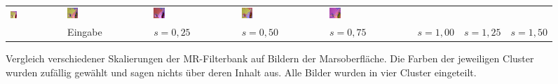 \begin{figure}[h!]
\begin{tabular}{m{15pt}m{}m{}m{}m{}m{}m{}m{}}
		\includegraphics[width=0.14\textwidth]{images/gen/filter_size/p03_04.png_0.50.png} &
		\includegraphics[width=0.14\textwidth]{images/gen/filter_size/p03_04.png_0.75.png} &
		\includegraphics[width=0.14\textwidth]{images/gen/filter_size/p03_04.png_1.00.png} &
		\includegraphics[width=0.14\textwidth]{images/gen/filter_size/p03_04.png_1.25.png} &
		\includegraphics[width=0.14\textwidth]{images/gen/filter_size/p03_04.png_1.50.png} \\
		
		&
		\vspace*{2pt}\centering Eingabe & 
		\vspace*{2pt}\centering $s=0,25$ &
		\vspace*{2pt}\centering $s=0,50$ &
		\vspace*{2pt}\centering $s=0,75$ &
		\vspace*{2pt}\centering $s=1,00$ &
		\vspace*{2pt}\centering $s=1,25$ &
		\vspace*{2pt}\centering $s=1,50$
	\end{tabular}
	\caption{Vergleich verschiedener Skalierungen der MR-Filterbank auf Bildern der Marsoberfläche. Die Farben der jeweiligen Cluster wurden zufällig gewählt und sagen nichts über deren Inhalt aus. Alle Bilder wurden in vier Cluster eingeteilt.}
	\label{fig:filterbank_sizes}
\end{figure}

